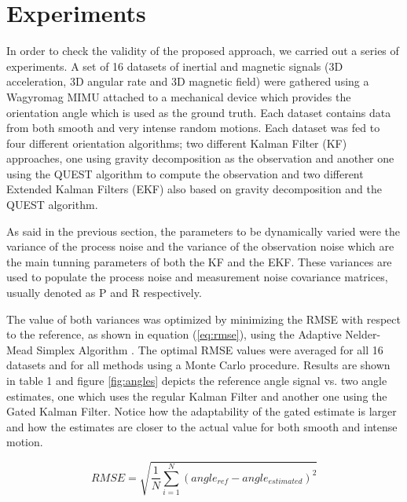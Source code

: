 \documentclass{IOS-Book-Article}
\begin{document}
\section{Experiments}
\label{sec:experiments}
\indent \indent In order to check the validity of the proposed approach, we carried out a series of experiments. A set of 16 datasets of inertial and magnetic signals (3D acceleration, 3D angular rate and 3D magnetic field) were gathered using a Wagyromag \cite{olivares_wagyromag_2011} MIMU attached to a mechanical device which provides the orientation angle which is used as the ground truth. Each dataset contains data from both smooth and very intense random motions. Each dataset was fed to four different orientation algorithms; two different Kalman Filter (KF) approaches, one using gravity decomposition as the observation and another one using the QUEST algorithm to compute the observation and two different Extended Kalman Filters (EKF) also based on gravity decomposition and the QUEST algorithm. 

As said in the previous section, the parameters to be dynamically varied were the variance of the process noise and the variance of the observation noise which are the main tunning parameters of both the KF and the EKF. These variances are used to populate the process noise and measurement noise covariance matrices, usually denoted as P and R respectively.

The value of both variances was optimized by minimizing the RMSE with respect to the reference, as shown in equation (\ref{eq:rmse}), using the Adaptive Nelder-Mead Simplex Algorithm \cite{gao2012}. The optimal RMSE values were averaged for all 16 datasets and for all methods using a Monte Carlo procedure. Results are shown in table 1 and figure \ref{fig:angles} depicts the reference angle signal vs. two angle estimates, one which uses the regular Kalman Filter and another one using the Gated Kalman Filter. Notice how the adaptability of the gated estimate is larger and how the estimates are closer to the actual value for both smooth and intense motion.

\begin{equation}
RMSE=\sqrt{\frac{1}{N}\sum_{i=1}^{N}\left(angle_{ref}-angle_{estimated}\right)^{2}}
\label{eq:rmse}
\end{equation}
\end{document}
